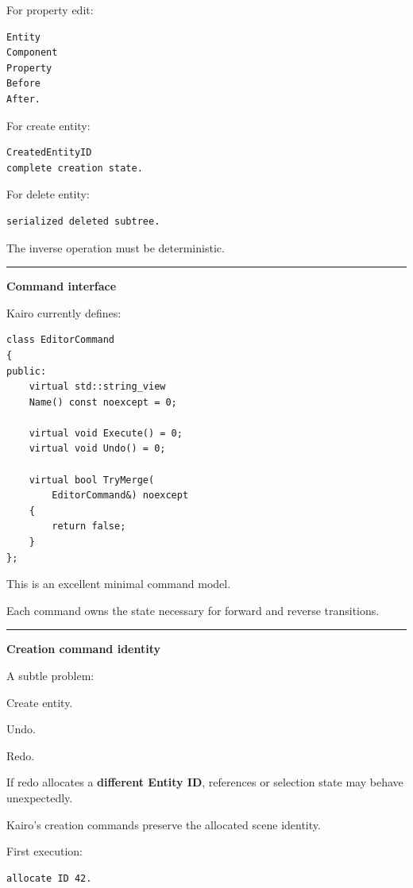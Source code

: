 For property edit:

\begin{verbatim}
Entity
Component
Property
Before
After.
\end{verbatim}

For create entity:

\begin{verbatim}
CreatedEntityID
complete creation state.
\end{verbatim}

For delete entity:

\begin{verbatim}
serialized deleted subtree.
\end{verbatim}

The inverse operation must be deterministic.

\begin{center}\rule{0.5\linewidth}{0.5pt}\end{center}

\textbf{Command interface}

Kairo currently defines:

\begin{verbatim}
class EditorCommand
{
public:
    virtual std::string_view
    Name() const noexcept = 0;

    virtual void Execute() = 0;
    virtual void Undo() = 0;

    virtual bool TryMerge(
        EditorCommand&) noexcept
    {
        return false;
    }
};
\end{verbatim}

This is an excellent minimal command model.

Each command owns the state necessary for forward and reverse transitions.

\begin{center}\rule{0.5\linewidth}{0.5pt}\end{center}

\textbf{Creation command identity}

A subtle problem:

Create entity.

Undo.

Redo.

If redo allocates a \textbf{different Entity ID}, references or selection state may behave unexpectedly.

Kairo's creation commands preserve the allocated scene identity.

First execution:

\begin{verbatim}
allocate ID 42.
\end{verbatim}

